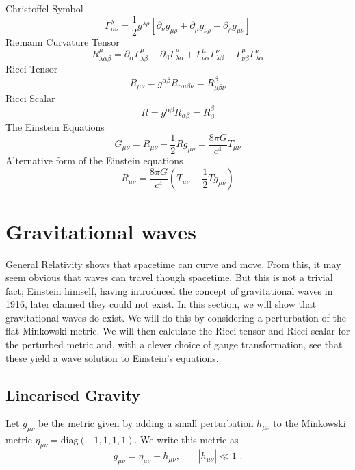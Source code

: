 \documentclass[11pt]{cuthesis}
\newcommand{\mn}{_{\mu\nu}}
\begin{document}
Christoffel Symbol
\begin{equation} \label{christ}
\Gamma^\lambda\mn=\frac{1}{2}g^{\lambda \rho} [\partial_\nu g_{\mu \rho} + \partial_\mu g_{\nu \rho}-\partial_\rho g\mn]
\end{equation}
Riemann Curvature Tensor  
\begin{equation} \label{rct}
R^\mu_{\lambda \alpha \beta} = \partial_\alpha \Gamma^\mu_{\lambda \beta} -\partial_\beta \Gamma^\mu_{\lambda \alpha} + \Gamma^\mu_{\nu \alpha} \Gamma^\nu_{\lambda \beta} - \Gamma^\mu_{\nu \beta} \Gamma^\nu_{\lambda \alpha}
\end{equation}
Ricci Tensor
\begin{equation} \label{rt}
R\mn=g^{\alpha \beta} R_{\alpha \mu \beta \nu}=R^\beta_{\mu \beta \nu}
\end{equation}
Ricci Scalar
\begin{equation} \label{rs}
R=g^{\alpha \beta}R_{\alpha \beta}=R^\beta_\beta
\end{equation}
The Einstein Equations
\begin{equation} \label{eineq}
G\mn =R\mn -\frac{1}{2} R g\mn=\frac{8 \pi G}{c^4}T\mn
\end{equation}
Alternative form of the Einstein equations
\begin{equation} \label{alt einstein}
R\mn = \frac{8 \pi G}{c^4}\left( T\mn - \frac{1}{2}Tg\mn \right) 
\end{equation}


\section{Gravitational waves}
General Relativity shows that spacetime can curve and move. From this, it may seem obvious that waves can travel though spacetime. But this is not a trivial fact; Einstein himself, having introduced the concept of gravitational waves in 1916, later claimed they could not exist. In this section, we will show that gravitational waves do exist. We will do this by considering a perturbation of the flat Minkowski metric. We will then calculate the Ricci tensor and Ricci scalar for the perturbed metric and, with a clever choice of gauge transformation, see that these yield a wave solution to Einstein's equations. 

\subsection{Linearised Gravity}
Let $g\mn$ be the metric given by adding a small perturbation $h_{\mu\nu}$ to the Minkowski metric $\eta\mn=\text{diag}(-1,1,1,1)$. We write this metric as 
\begin{equation} \label{pert metric}
g\mn=\eta_{\mu\nu}+h_{\mu\nu} \text{, } \hspace{20pt} |h_{\mu\nu}| \ll 1 \text{ .}
\end{equation}
\end{document}
